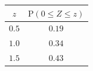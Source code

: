 {\setlength{\tabcolsep}{5pt}\renewcommand{\arraystretch}{1.25}%
\begin{tabular}{|c|c|}
\hline
$z$ & $\mathrm{P}(0\le Z\le z)$ \\
\hline
$0.5$ & $0.19$ \\
\hline
$1.0$ & $0.34$ \\
\hline
$1.5$ & $0.43$ \\
\hline
\end{tabular}}

